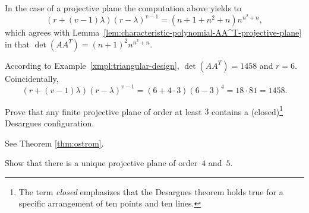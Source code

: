 \begin{test}
    In the case of a projective plane the computation above yields to
    $$
        (r+(v-1)\lambda)(r-\lambda)^{v-1}=(n+1+n^2+n)n^{n^2+n},
    $$
    which agrees with Lemma~\ref{lem:characteristic-polynomial-AA^T-projective-plane} in that $\det(AA^T)=(n+1)^2n^{n^2+n}$.
\end{test}

\begin{test}
    According to Example~\ref{xmpl:triangular-design}, $\det(AA^T)=1458$ and $r=6$. Coincidentally,
    $$
        (r+(v-1)\lambda)(r-\lambda)^{v-1}
            = (6+4\cdot3)(6-3)^4=18\cdot81=1458.
    $$
\end{test}

\begin{exr}
     Prove that any finite projective plane of order at least\/ $3$ contains a (closed)\footnote{The term \textit{closed} emphasizes that the Desargues theorem holds true for a specific arrangement of ten points and ten lines.} Desargues configuration.
\end{exr}

\begin{solution}
    See Theorem \ref{thm:ostrom}.
\end{solution}
    

\begin{exr}\label{exr:order-4=PG(2,4)}
    Show that there is a unique projective plane of order\/~$4$ and\/~$5$.
\end{exr}

